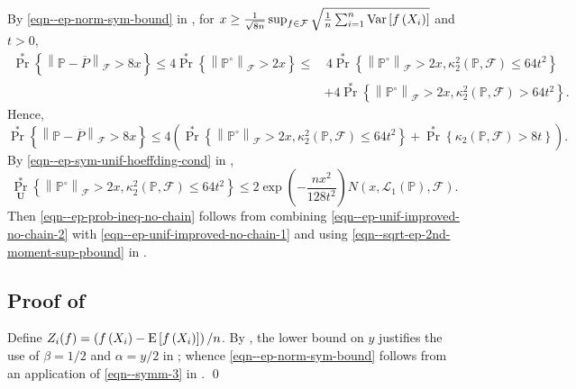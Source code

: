 By \eqref{eqn--ep-norm-sym-bound} in , for \(x \geq
\frac{1}{\sqrt{8 n}} \sup_{f \in \mathcal{F}} \sqrt{\frac{1}{n}
\sum_{i = 1}^{n} \mathrm{Var} \left[ f \left( X_{i} \right) \right]}\) and \(t > 0\),
\begin{align*}
  \Pr^{\ast} \left\{ \left\| \mathbb{P} - \overline{P} \right\|_{\mathcal{F}} >
  8 x \right\} \leq 4 \Pr^{\ast} \left\{ \left\| \mathbb{P}^{\circ}
  \right\|_{\mathcal{F}} > 2 x \right\} \leq
  & \, 4 \Pr^{\ast} \left\{ \left\| \mathbb{P}^{\circ} \right\|_{\mathcal{F}} >
  2 x, \kappa_{2}^{2} (\mathbb{P}, \mathcal{F}) \leq 64 t^{2} \right\} \\
  & + 4 \Pr^{\ast} \left\{ \left\| \mathbb{P}^{\circ} \right\|_{\mathcal{F}} > 2
  x, \kappa_{2}^{2} (\mathbb{P}, \mathcal{F}) > 64 t^{2} \right\}.
\end{align*}
Hence,
\begin{equation}
  \Pr^{\ast} \left\{ \left\| \mathbb{P} - \overline{P} \right\|_{\mathcal{F}} >
  8 x \right\} \leq 4 \left( \Pr^{\ast} \left\{ \left\| \mathbb{P}^{\circ}
  \right\|_{\mathcal{F}} > 2 x, \kappa_{2}^{2} (\mathbb{P}, \mathcal{F}) \leq 64
  t^{2} \right\} + \Pr^{\ast} \left\{ \kappa_{2} (\mathbb{P}, \mathcal{F}) >
  8 t \right\} \right).
  \label{eqn--ep-unif-improved-no-chain-1}
\end{equation}
By \eqref{eqn--ep-sym-unif-hoeffding-cond} in
,
\begin{equation}
  \Pr_{\mathbf{U}}^{\ast} \left\{ \left\| \mathbb{P}^{\circ}
  \right\|_{\mathcal{F}} > 2 x, \kappa_{2}^{2} (\mathbb{P}, \mathcal{F}) \leq 64
  t^{2} \right\} \leq 2 \exp \left( - \frac{n x^{2}}{128 t^{2}} \right) N \left(
  x, \mathscr{L}_{1} (\mathbb{P}), \mathcal{F} \right).
  \label{eqn--ep-unif-improved-no-chain-2}
\end{equation}
Then \eqref{eqn--ep-prob-ineq-no-chain} follows from combining
\eqref{eqn--ep-unif-improved-no-chain-2} with
\eqref{eqn--ep-unif-improved-no-chain-1} and using
\eqref{eqn--sqrt-ep-2nd-moment-sup-pbound} in
.

\subsection{Proof of \texorpdfstring{%
}{Lemma \ref{lem--ep-norm-sym-bound}}}
\label{sc--prf--lem--ep-norm-sym-bound}

Define \(Z_{i} (f) = \left( f \left( X_{i} \right) - \mathrm{E} \left[ f
\left( X_{i} \right) \right] \right) / n\).
By , the lower bound on \(y\) justifies the use of
\(\beta = 1 / 2\) and \(\alpha = y / 2\) in ; whence
\eqref{eqn--ep-norm-sym-bound} follows from an application of
\eqref{eqn--symm-3} in .
\qed

